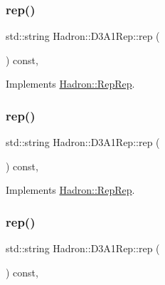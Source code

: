 \subsubsection{\texorpdfstring{rep()}{rep()}\hspace{0.1cm}{\footnotesize\ttfamily [3/5]}}
{\footnotesize\ttfamily std\+::string Hadron\+::\+D3\+A1\+Rep\+::rep (\begin{DoxyParamCaption}{ }\end{DoxyParamCaption}) const\hspace{0.3cm}{\ttfamily [inline]}, {\ttfamily [virtual]}}



Implements \mbox{\hyperlink{structHadron_1_1RepRep_ab3213025f6de249f7095892109575fde}{Hadron\+::\+Rep\+Rep}}.

\mbox{\label{structHadron_1_1D3A1Rep_aa6bbeffd53b5c6efd58e5269da0779b2}} 
\subsubsection{\texorpdfstring{rep()}{rep()}\hspace{0.1cm}{\footnotesize\ttfamily [4/5]}}
{\footnotesize\ttfamily std\+::string Hadron\+::\+D3\+A1\+Rep\+::rep (\begin{DoxyParamCaption}{ }\end{DoxyParamCaption}) const\hspace{0.3cm}{\ttfamily [inline]}, {\ttfamily [virtual]}}



Implements \mbox{\hyperlink{structHadron_1_1RepRep_ab3213025f6de249f7095892109575fde}{Hadron\+::\+Rep\+Rep}}.

\mbox{\label{structHadron_1_1D3A1Rep_aa6bbeffd53b5c6efd58e5269da0779b2}} 
\subsubsection{\texorpdfstring{rep()}{rep()}\hspace{0.1cm}{\footnotesize\ttfamily [5/5]}}
{\footnotesize\ttfamily std\+::string Hadron\+::\+D3\+A1\+Rep\+::rep (\begin{DoxyParamCaption}{ }\end{DoxyParamCaption}) const\hspace{0.3cm}{\ttfamily [inline]}, {\ttfamily [virtual]}}



